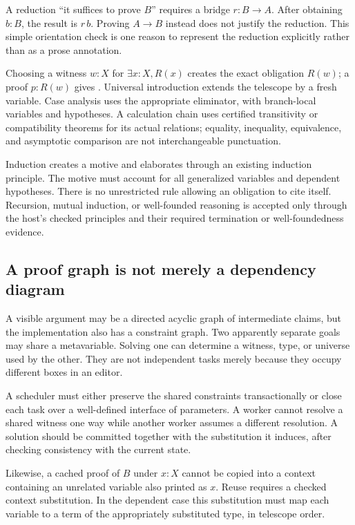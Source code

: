 \documentclass[11pt,letterpaper]{article}
\newcommand{\code}[1]{\texttt{\detokenize{#1}}}
\theoremstyle{remark}
\begin{document}
A reduction ``it suffices to prove $B$'' requires a bridge $r:B\to A$. After obtaining $b:B$, the result is $r\,b$. Proving $A\to B$ instead does not justify the reduction. This simple orientation check is one reason to represent the reduction explicitly rather than as a prose annotation.

Choosing a witness $w:X$ for $\exists x:X, R(x)$ creates the exact obligation $R(w)$; a proof $p:R(w)$ gives \code{Exists.intro w p}. Universal introduction extends the telescope by a fresh variable. Case analysis uses the appropriate eliminator, with branch-local variables and hypotheses. A calculation chain uses certified transitivity or compatibility theorems for its actual relations; equality, inequality, equivalence, and asymptotic comparison are not interchangeable punctuation.

Induction creates a motive and elaborates through an existing induction principle. The motive must account for all generalized variables and dependent hypotheses. There is no unrestricted rule allowing an obligation to cite itself. Recursion, mutual induction, or well-founded reasoning is accepted only through the host's checked principles and their required termination or well-foundedness evidence.

\subsection{A proof graph is not merely a dependency diagram}

A visible argument may be a directed acyclic graph of intermediate claims, but the implementation also has a constraint graph. Two apparently separate goals may share a metavariable. Solving one can determine a witness, type, or universe used by the other. They are not independent tasks merely because they occupy different boxes in an editor.

A scheduler must either preserve the shared constraints transactionally or close each task over a well-defined interface of parameters. A worker cannot resolve a shared witness one way while another worker assumes a different resolution. A solution should be committed together with the substitution it induces, after checking consistency with the current state.

Likewise, a cached proof of $B$ under $x:X$ cannot be copied into a context containing an unrelated variable also printed as $x$. Reuse requires a checked context substitution. In the dependent case this substitution must map each variable to a term of the appropriately substituted type, in telescope order.
\end{document}
